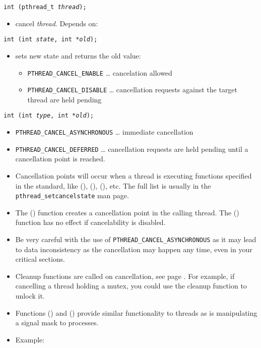 \begin{slide}
\setlength{\baselineskip}{0.9\baselineskip}
\texttt{int (pthread\_t \emph{thread});}
\begin{itemize}
\item cancel \emph{thread}.  Depends on:
\end{itemize}
\texttt{int (int \emph{state},
int *\emph{old});}
\begin{itemize}
\item sets new state and returns the old value:
    \begin{itemize}
    \item \texttt{PTHREAD\_CANCEL\_ENABLE} \dots{} cancelation allowed
    \item \texttt{PTHREAD\_CANCEL\_DISABLE} \dots{} cancellation requests
    against the target thread are held pending
    \end{itemize}
\end{itemize}
\texttt{int (int \emph{type}, int *\emph{old});}
\begin{itemize}
\item \texttt{PTHREAD\_CANCEL\_ASYNCHRONOUS} \dots{} immediate cancellation
\item \texttt{PTHREAD\_CANCEL\_DEFERRED} \dots{} cancellation requests are held
pending until a cancellation point is reached.
\end{itemize}
\end{slide}

\begin{itemize}
\item Cancellation points will occur when a thread is executing functions
specified in the standard, like (), (),
(), etc.  The full list is usually in the
\texttt{pthread\_setcancelstate} man page.
\item The () function creates a cancellation point in
the calling thread.  The () function has no effect if
cancelability is disabled.
\item Be very careful with the use of \texttt{PTHREAD\_CANCEL\_ASYNCHRONOUS} as
it may lead to data inconsistency as the cancellation may happen any time, even
in your critical sections.
\item Cleanup functions are called on cancellation, see page
\pageref{PTHREAD_CLEANUP}.  For example, if cancelling a thread holding a mutex,
you could use the cleanup function to unlock it.
\item Functions () and
() provide similar functionality to threads as is
manipulating a signal mask to processes.
\item \label{PTHREAD_CANCEL} Example: 
\end{itemize}

